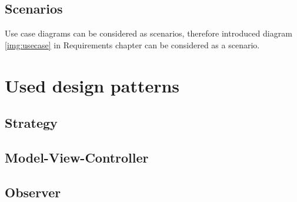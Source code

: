 \subsection{Scenarios}
Use case diagrams can be considered as scenarios, therefore introduced diagram \ref{img:usecase} in Requirements chapter can be considered as a scenario.

\section{Used design patterns}
\subsection{Strategy}
\subsection{Model-View-Controller}
\subsection{Observer}